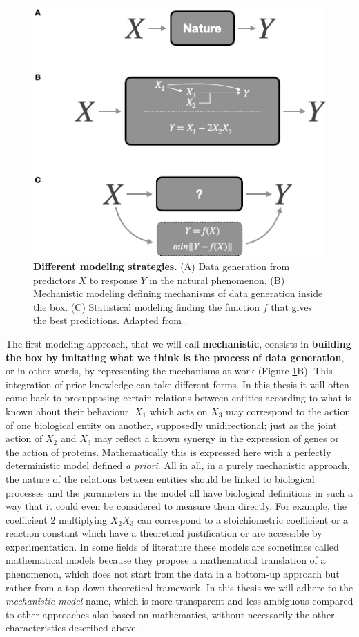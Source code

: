 \documentclass[a4paper,12pt,twoside,onecolumn,openright,final,oldfontcommands]{memoir}
\begin{document}
\begin{figure}

{\centering \includegraphics[width=0.6\linewidth]{fig/boxes} 

}

\caption[Different modeling strategies.]{\textbf{Different modeling strategies.} (A) Data
generation from predictors \(X\) to response \(Y\) in the natural
phenomenon. (B) Mechanistic modeling defining mechanisms of data
generation inside the box. (C) Statistical modeling finding the function
\(f\) that gives the best predictions. Adapted from
\citet{breiman2001statistical}.}\label{fig:boxes}
\end{figure}








The first modeling approach, that we will call \textbf{mechanistic},
consists in \textbf{building the box by imitating what we think is the
process of data generation}, or in other words, by representing the
mechanisms at work (Figure \ref{fig:boxes}B). This integration of prior
knowledge can take different forms. In this thesis it will often come
back to presupposing certain relations between entities according to
what is known about their behaviour. \(X_1\) which acts on \(X_3\) may
correspond to the action of one biological entity on another, supposedly
unidirectional; just as the joint action of \(X_2\) and \(X_3\) may
reflect a known synergy in the expression of genes or the action of
proteins. Mathematically this is expressed here with a perfectly
deterministic model defined \emph{a priori}. All in all, in a purely
mechanistic approach, the nature of the relations between entities
should be linked to biological processes and the parameters in the model
all have biological definitions in such a way that it could even be
considered to measure them directly. For example, the coefficient \(2\)
multiplying \(X_2X_3\) can correspond to a stoichiometric coefficient or
a reaction constant which have a theoretical justification or are
accessible by experimentation. In some fields of literature these models
are sometimes called mathematical models because they propose a
mathematical translation of a phenomenon, which does not start from the
data in a bottom-up approach but rather from a top-down theoretical
framework. In this thesis we will adhere to the \emph{mechanistic model}
name, which is more transparent and less ambiguous compared to other
approaches also based on mathematics, without necessarily the other
characteristics described above.
\end{document}
